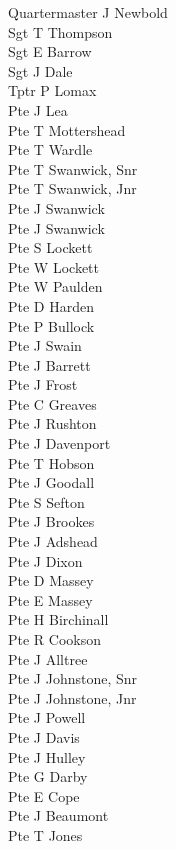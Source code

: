 \begin{multicols}{3}
  \small
  \noindent
  Quartermaster J Newbold \\
  Sgt T Thompson \\
  Sgt E Barrow \\
  Sgt J Dale \\
  Tptr P Lomax \\
  Pte J Lea \\
  Pte T Mottershead \\
  Pte T Wardle \\
  Pte T Swanwick, Snr \\
  Pte T Swanwick, Jnr \\
  Pte J Swanwick \\
  Pte J Swanwick \\
  Pte S Lockett \\
  Pte W Lockett \\
  Pte W Paulden \\
  Pte D Harden \\
  Pte P Bullock \\
  Pte J Swain \\
  Pte J Barrett \\
  Pte J Frost \\
  Pte C Greaves \\
  Pte J Rushton \\
  Pte J Davenport \\
  Pte T Hobson \\
  Pte J Goodall \\
  Pte S Sefton \\
  Pte J Brookes \\
  Pte J Adshead \\
  Pte J Dixon \\
  Pte D Massey \\
  Pte E Massey \\
  Pte H Birchinall \\
  Pte R Cookson \\
  Pte J Alltree \\
  Pte J Johnstone, Snr \\
  Pte J Johnstone, Jnr \\
  Pte J Powell \\
  Pte J Davis \\
  Pte J Hulley \\
  Pte G Darby \\
  Pte E Cope \\
  Pte J Beaumont \\
  Pte T Jones \\

\end{multicols}
